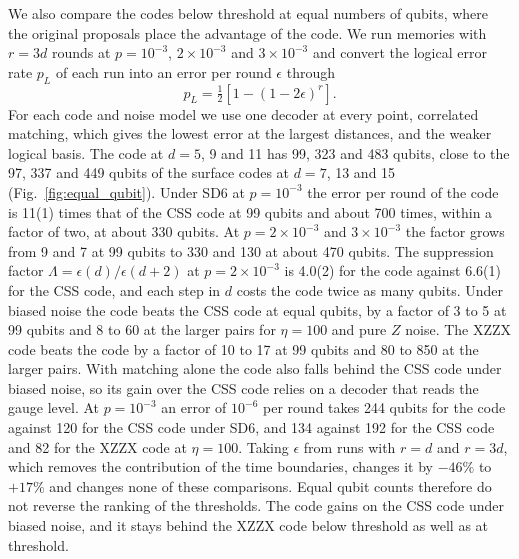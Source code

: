 
We also compare the codes below threshold at equal numbers of qubits, where the original proposals place the advantage of the \XYZ{} code. We run memories with $r=3d$ rounds at $p=10^{-3}$, $2\times10^{-3}$ and $3\times10^{-3}$ and convert the logical error rate $p_L$ of each run into an error per round $\epsilon$ through
\begin{equation}
p_L=\tfrac{1}{2}\left[1-(1-2\epsilon)^{r}\right].
\label{eq:eps_per_round}
\end{equation}
For each code and noise model we use one decoder at every point, correlated matching, which gives the lowest error at the largest distances, and the weaker logical basis. The \XYZ{} code at $d=5$, 9 and 11 has 99, 323 and 483 qubits, close to the 97, 337 and 449 qubits of the surface codes at $d=7$, 13 and 15 (Fig.~\ref{fig:equal_qubit}). Under SD6 at $p=10^{-3}$ the error per round of the \XYZ{} code is 11(1) times that of the CSS code at 99 qubits and about 700 times, within a factor of two, at about 330 qubits. At $p=2\times10^{-3}$ and $3\times10^{-3}$ the factor grows from 9 and 7 at 99 qubits to 330 and 130 at about 470 qubits. The suppression factor $\Lambda=\epsilon(d)/\epsilon(d+2)$ at $p=2\times10^{-3}$ is 4.0(2) for the \XYZ{} code against 6.6(1) for the CSS code, and each step in $d$ costs the \XYZ{} code twice as many qubits. Under biased noise the \XYZ{} code beats the CSS code at equal qubits, by a factor of 3 to 5 at 99 qubits and 8 to 60 at the larger pairs for $\eta=100$ and pure $Z$ noise. The XZZX code beats the \XYZ{} code by a factor of 10 to 17 at 99 qubits and 80 to 850 at the larger pairs. With matching alone the \XYZ{} code also falls behind the CSS code under biased noise, so its gain over the CSS code relies on a decoder that reads the gauge level. At $p=10^{-3}$ an error of $10^{-6}$ per round takes 244 qubits for the \XYZ{} code against 120 for the CSS code under SD6, and 134 against 192 for the CSS code and 82 for the XZZX code at $\eta=100$. Taking $\epsilon$ from runs with $r=d$ and $r=3d$, which removes the contribution of the time boundaries, changes it by $-46\%$ to $+17\%$ and changes none of these comparisons. Equal qubit counts therefore do not reverse the ranking of the thresholds. The \XYZ{} code gains on the CSS code under biased noise, and it stays behind the XZZX code below threshold as well as at threshold.


